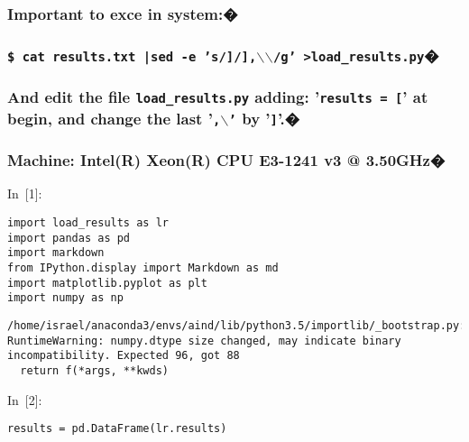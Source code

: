 \documentclass{article}
\begin{document}
  
    





\subsubsection*{Important to exce in system:�}\subsubsection*{\texttt{\$ cat results.txt |sed -e 's/]/],$\backslash$$\backslash$/g' >load\_results.py}�}\subsubsection*{And edit the file \texttt{load\_results.py} adding: '\texttt{results = [}' at begin, and change the last '\texttt{,$\backslash$'} by '\texttt{]}'.�}\subsubsection*{Machine: Intel(R) Xeon(R) CPU E3-1241 v3 @ 3.50GHz�}





In~[1]:

    
\begin{verbatim}import load_results as lr
import pandas as pd
import markdown
from IPython.display import Markdown as md
import matplotlib.pyplot as plt
import numpy as np
\end{verbatim}















\begin{verbatim}/home/israel/anaconda3/envs/aind/lib/python3.5/importlib/_bootstrap.py:222: RuntimeWarning: numpy.dtype size changed, may indicate binary incompatibility. Expected 96, got 88
  return f(*args, **kwds)
\end{verbatim}









In~[2]:

    
\begin{verbatim}results = pd.DataFrame(lr.results)
\end{verbatim}
\end{document}
